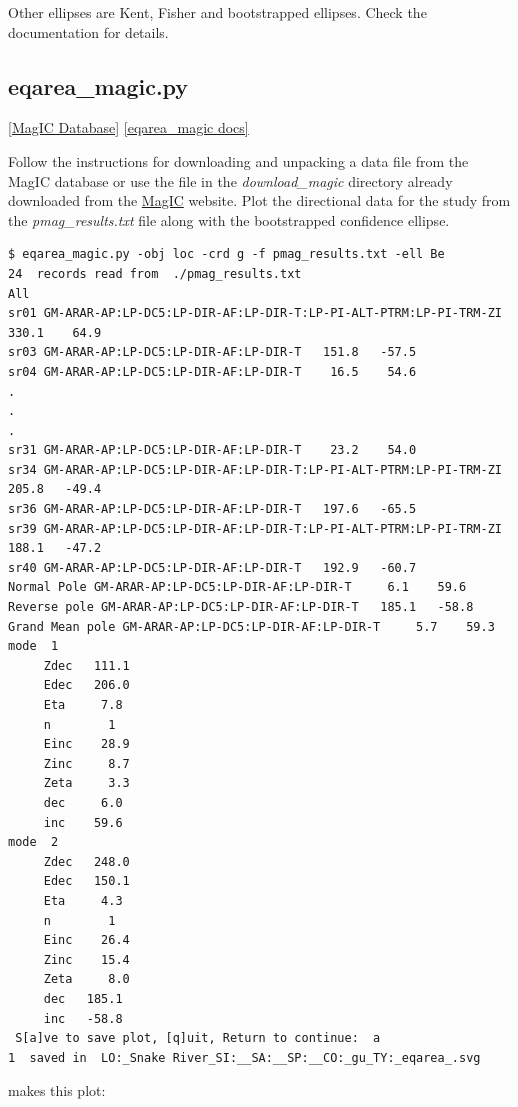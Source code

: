 \documentclass[11pt]{book}
\begin{document}
{{Other ellipses are Kent, Fisher and bootstrapped ellipses.  Check the documentation for details.

\subsection{eqarea\_magic.py} \href{#MagICDatabase}{[MagIC Database]}
\href{https://github.com/PmagPy/PmagPy/blob/master/programs/eqarea_magic.py}{[eqarea\_magic docs]}

Follow the instructions for downloading and unpacking a data file from the MagIC database or use the file in the {\it download\_magic} directory already downloaded from the  \href{http://earthref.org/MagIC/search}{MagIC} website.    Plot the directional data for the study from the {\it pmag\_results.txt} file along with the bootstrapped
 confidence ellipse.

\begin{verbatim}
$ eqarea_magic.py -obj loc -crd g -f pmag_results.txt -ell Be
24  records read from  ./pmag_results.txt
All
sr01 GM-ARAR-AP:LP-DC5:LP-DIR-AF:LP-DIR-T:LP-PI-ALT-PTRM:LP-PI-TRM-ZI   330.1    64.9
sr03 GM-ARAR-AP:LP-DC5:LP-DIR-AF:LP-DIR-T   151.8   -57.5
sr04 GM-ARAR-AP:LP-DC5:LP-DIR-AF:LP-DIR-T    16.5    54.6
.
.
.
sr31 GM-ARAR-AP:LP-DC5:LP-DIR-AF:LP-DIR-T    23.2    54.0
sr34 GM-ARAR-AP:LP-DC5:LP-DIR-AF:LP-DIR-T:LP-PI-ALT-PTRM:LP-PI-TRM-ZI   205.8   -49.4
sr36 GM-ARAR-AP:LP-DC5:LP-DIR-AF:LP-DIR-T   197.6   -65.5
sr39 GM-ARAR-AP:LP-DC5:LP-DIR-AF:LP-DIR-T:LP-PI-ALT-PTRM:LP-PI-TRM-ZI   188.1   -47.2
sr40 GM-ARAR-AP:LP-DC5:LP-DIR-AF:LP-DIR-T   192.9   -60.7
Normal Pole GM-ARAR-AP:LP-DC5:LP-DIR-AF:LP-DIR-T     6.1    59.6
Reverse pole GM-ARAR-AP:LP-DC5:LP-DIR-AF:LP-DIR-T   185.1   -58.8
Grand Mean pole GM-ARAR-AP:LP-DC5:LP-DIR-AF:LP-DIR-T     5.7    59.3
mode  1
     Zdec   111.1
     Edec   206.0
     Eta     7.8
     n        1
     Einc    28.9
     Zinc     8.7
     Zeta     3.3
     dec     6.0
     inc    59.6
mode  2
     Zdec   248.0
     Edec   150.1
     Eta     4.3
     n        1
     Einc    26.4
     Zinc    15.4
     Zeta     8.0
     dec   185.1
     inc   -58.8
 S[a]ve to save plot, [q]uit, Return to continue:  a
1  saved in  LO:_Snake River_SI:__SA:__SP:__CO:_gu_TY:_eqarea_.svg
\end{verbatim}

\noindent makes this plot:

}}
\end{document}
